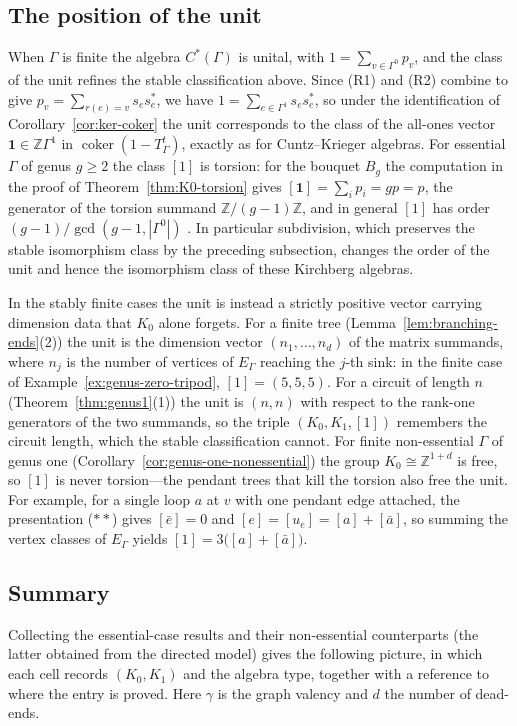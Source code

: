 \documentclass[12pt,reqno]{amsart}
\theoremstyle{plain}
\theoremstyle{definition}
\newcommand{\Z}{\mathbb{Z}}
\newcommand{\coker}{\operatorname{coker}}
\begin{document}
\subsection*{The position of the unit}
When $\Gamma$ is finite the algebra $C^*(\Gamma)$ is unital, with $1=\sum_{v\in\Gamma^0}p_v$, and
the class of the unit refines the stable classification above. Since (R1) and (R2) combine to give
$p_v=\sum_{r(e)=v}s_es_e^{*}$, we have $1=\sum_{e\in\Gamma^1}s_es_e^{*}$, so under the
identification of Corollary~\ref{cor:ker-coker} the unit corresponds to the class of the all-ones
vector $\mathbf{1}\in\Z\Gamma^1$ in $\coker(1-T_\Gamma^{t})$, exactly as for Cuntz--Krieger
algebras. For essential $\Gamma$ of genus $g\ge 2$ the class $[1]$ is torsion: for the bouquet
$B_g$ the computation in the proof of Theorem~\ref{thm:K0-torsion} gives
$[\mathbf{1}]=\sum_ip_i=gp=p$, the generator of the torsion summand $\Z/(g-1)\Z$, and in general
$[1]$ has order $(g-1)/\gcd(g-1,|\Gamma^0|)$ \cite{CLM}. In particular subdivision, which
preserves the stable isomorphism class by the preceding subsection, changes the order of the unit
and hence the isomorphism class of these Kirchberg algebras.

In the stably finite cases the unit is instead a strictly positive vector carrying dimension data
that $K_0$ alone forgets. For a finite tree \textup(Lemma~\ref{lem:branching-ends}(2)\textup) the
unit is the dimension vector $(n_1,\dots,n_d)$ of the matrix summands, where $n_j$ is the number
of vertices of $E_\Gamma$ reaching the $j$-th sink: in the finite case of
Example~\ref{ex:genus-zero-tripod}, $[1]=(5,5,5)$. For a circuit of length $n$
\textup(Theorem~\ref{thm:genus1}(1)\textup) the unit is $(n,n)$ with respect to the rank-one
generators of the two summands, so the triple $(K_0,K_1,[1])$ remembers the circuit length, which
the stable classification cannot. For finite non-essential $\Gamma$ of genus one
\textup(Corollary~\ref{cor:genus-one-nonessential}\textup) the group $K_0\cong\Z^{1+d}$ is free,
so $[1]$ is never torsion---the pendant trees that kill the torsion also free the unit. For
example, for a single loop $a$ at $v$ with one pendant edge attached, the presentation \textup($**$\textup)
gives $[\bar e]=0$ and $[e]=[u_e]=[a]+[\bar a]$, so summing the vertex classes of $E_\Gamma$
yields $[1]=3\big([a]+[\bar a]\big)$.

\subsection*{Summary} Collecting the essential-case results and their non-essential counterparts
(the latter obtained from the directed model) gives the following
picture, in which each cell records $(K_0,K_1)$ and the algebra type, together with a reference to
where the entry is proved. Here $\gamma$ is the graph valency and $d$ the number of dead-ends.
\end{document}
